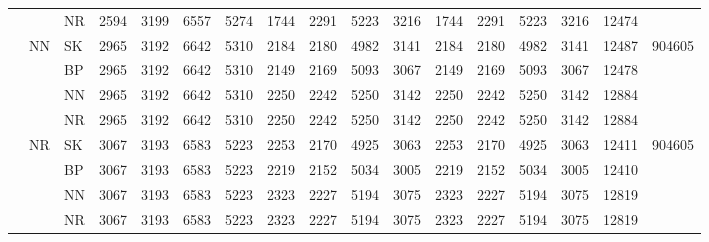 \documentclass[../main/main.tex]{subfiles}
\begin{document}
\begin{table}
\begin{adjustbox}{max width=\textwidth}
\begin{threeparttable}
\begin{tabular}{cllcccccccccccccc}
                       &      & NR   &
                2594   & 3199 & 6557 & 5274 &
                1744   & 2291 & 5223 & 3216 &
                1744   & 2291 & 5223 & 3216 &
                12474  &
                \\ \cmidrule(lr){2-17}
                       & \multirow{4}{*}{NN}     & SK   &
                2965   & 3192                    & 6642 & 5310 &
                2184   & 2180                    & 4982 & 3141 &
                2184   & 2180                    & 4982 & 3141 &
                12487  & \multirow{4}{*}{904605}
                \\
                       &      & BP   &
                2965   & 3192 & 6642 & 5310 &
                2149   & 2169 & 5093 & 3067 &
                2149   & 2169 & 5093 & 3067 &
                12478  &
                \\
                       &      & NN   &
                2965   & 3192 & 6642 & 5310 &
                2250   & 2242 & 5250 & 3142 &
                2250   & 2242 & 5250 & 3142 &
                12884  &
                \\
                       &      & NR   &
                2965   & 3192 & 6642 & 5310 &
                2250   & 2242 & 5250 & 3142 &
                2250   & 2242 & 5250 & 3142 &
                12884  &
                \\ \cmidrule(lr){2-17}
                       & \multirow{4}{*}{NR}     & SK   &
                3067   & 3193                    & 6583 & 5223 &
                2253   & 2170                    & 4925 & 3063 &
                2253   & 2170                    & 4925 & 3063 &
                12411  & \multirow{4}{*}{904605}
                \\
                       &      & BP   &
                3067   & 3193 & 6583 & 5223 &
                2219   & 2152 & 5034 & 3005 &
                2219   & 2152 & 5034 & 3005 &
                12410  &
                \\
                       &      & NN   &
                3067   & 3193 & 6583 & 5223 &
                2323   & 2227 & 5194 & 3075 &
                2323   & 2227 & 5194 & 3075 &
                12819  &
                \\
                       &      & NR   &
                3067   & 3193 & 6583 & 5223 &
                2323   & 2227 & 5194 & 3075 &
                2323   & 2227 & 5194 & 3075 &
                12819  &
                \\
                \bottomrule

\end{tabular}
\end{threeparttable}
\end{adjustbox}
\end{table}
\end{document}
